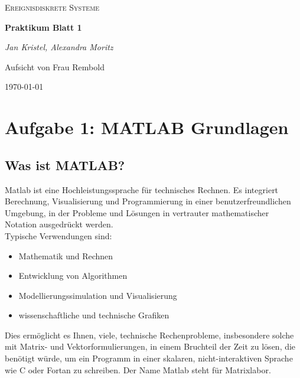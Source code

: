 \documentclass{article}
\begin{document}
	\begin{titlepage}
		\centering
		{\scshape\LARGE
			Ereignisdiskrete Systeme
			\par}
		\vspace{1.5cm}
		{\huge\bfseries Praktikum Blatt 1\par}
		\vspace{1.5cm}
		{\LARGE\itshape Jan Kristel, Alexandra Moritz\par}
		\vfill
			Aufsicht von Frau Rembold\par
			
		\vfill	
			{\large \today \par}	
		
	\end{titlepage}
	
	\tableofcontents
	\newpage
	\section{Aufgabe 1: MATLAB Grundlagen}
		\subsection{Was ist MATLAB?}
		Matlab ist eine Hochleistungssprache für technisches Rechnen. Es integriert Berechnung, Visualisierung und Programmierung in einer benutzerfreundlichen Umgebung, in der Probleme und Lösungen in vertrauter mathematischer Notation ausgedrückt werden. \\
		Typische Verwendungen sind:
		\begin{itemize}
			\item Mathematik und Rechnen
			\item Entwicklung von Algorithmen
			\item Modellierungssimulation und Visualisierung
			\item wissenschaftliche und technische Grafiken
		\end{itemize}
		Dies ermöglicht es Ihnen, viele, technische Rechenprobleme, insbesondere solche mit Matrix- und Vektorformulierungen, in einem Bruchteil der Zeit zu lösen, die benötigt würde, um ein Programm in einer skalaren, nicht-interaktiven Sprache wie C oder Fortan zu schreiben. Der Name Matlab steht für Matrixlabor.
\end{document}
